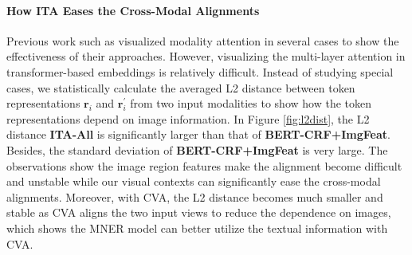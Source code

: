\documentclass[11pt]{article}
\def\vr{{\bm{r}}}
\begin{document}
\paragraph{How ITA Eases the Cross-Modal Alignments}
Previous work such as \citet{moon-etal-2018-multimodal,Sun2021RpBERTAT} visualized modality attention in several cases to show the effectiveness of their approaches. However, visualizing the multi-layer attention in transformer-based embeddings is relatively difficult. Instead of studying special cases, we statistically calculate the averaged L2 distance between token representations $\vr_i$ and $\vr^{\prime}_i$ from two input modalities to show how the token representations depend on image information. In Figure \ref{fig:l2dist}, the L2 distance \textbf{ITA-All} is significantly larger than that of \textbf{BERT-CRF+ImgFeat}. Besides, the standard deviation of \textbf{BERT-CRF+ImgFeat} is very large. The observations show the image region features make the alignment become difficult and unstable while our visual contexts can significantly ease the cross-modal alignments. Moreover, with CVA, the L2 distance becomes much smaller and stable as CVA aligns the two input views to reduce the dependence on images, which shows the MNER model can better utilize the textual information with CVA.
\end{document}
